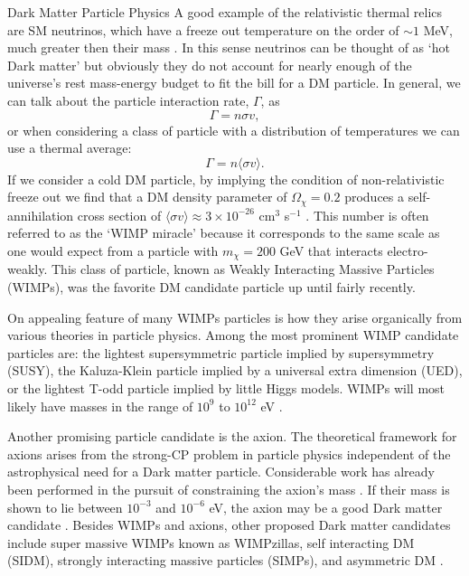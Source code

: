 \documentclass[a4paper,11pt]{article}
\begin{document}
\begin{section}{Dark Matter Particle Physics}
    A good example of the relativistic thermal relics are SM neutrinos, which have a freeze out temperature on the order of $\sim 1$ MeV, much greater then their mass \cite{Profumo}.
    In this sense neutrinos can be thought of as `hot Dark matter' but obviously they do not account for nearly enough of the universe's rest mass-energy budget to fit the bill for a DM particle.
    In general, we can talk about the particle interaction rate, $\Gamma$, as
    \begin{equation}
        \Gamma = n\sigma v,
    \end{equation}
    or when considering a class of particle with a distribution of temperatures we can use a thermal average:
    \begin{equation}
        \Gamma = n\langle\sigma v\rangle.
    \end{equation}
    If we consider a cold DM particle, by implying the condition of non-relativistic freeze out we find that a DM density parameter of $\Omega_\chi = 0.2$ produces a self-annihilation cross section of $\langle\sigma v\rangle \approx 3\times 10^{-26}$ cm$^3$ s$^{-1}$ \cite{Profumo}.
    This number is often referred to as the `WIMP miracle' because it corresponds to the same scale as one would expect from a particle with $m_\chi = 200$ GeV that interacts electro-weakly.
    This class of particle, known as Weakly Interacting Massive Particles (WIMPs), was the favorite DM candidate particle up until fairly recently.

    On appealing feature of many WIMPs particles is how they arise organically from various theories in particle physics.
    Among the most prominent WIMP candidate particles are: the lightest supersymmetric particle implied by supersymmetry (SUSY), the Kaluza-Klein particle implied by a universal extra dimension (UED), or the lightest T-odd particle implied by little Higgs models.
    WIMPs will most likely have masses in the range of $10^9$ to $10^{12}$ eV \cite{Freese:2017dm}.

    Another promising particle candidate is the axion.
    The theoretical framework for axions arises from the strong-CP problem in particle physics independent of the astrophysical need for a Dark matter particle.
    Considerable work has already been performed in the pursuit of constraining the axion's mass \cite{Freese:2017dm}. If their mass is shown to lie between $10^{-3}$ and $10^{-6}$ eV, the axion may be a good Dark matter candidate \cite{Wilczek:1978}\cite{Weinberg:1978}. 
    Besides WIMPs and axions, other proposed Dark matter candidates include super massive WIMPs known as WIMPzillas, self interacting DM (SIDM), strongly interacting massive particles (SIMPs), and asymmetric DM \cite{Freese:2017dm}.


\end{section}
\end{document}
